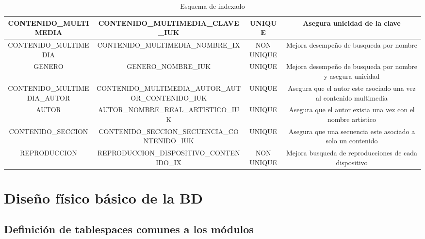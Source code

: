 \documentclass[journal]{IEEEtran}
\begin{document}
\begin{table}[H]
{\begin{tabular}{|c | c | c | c |}
   \hline
   CONTENIDO\_MULTIMEDIA & CONTENIDO\_MULTIMEDIA\_CLAVE\_IUK & UNIQUE & Asegura unicidad de la clave \\
   \hline
   CONTENIDO\_MULTIMEDIA & CONTENIDO\_MULTIMEDIA\_NOMBRE\_IX & NON UNIQUE & Mejora desempeño de busqueda por nombre \\
   \hline
   GENERO & GENERO\_NOMBRE\_IUK & UNIQUE & Mejora desempeño de busqueda por nombre y asegura unicidad \\
   \hline
   CONTENIDO\_MULTIMEDIA\_AUTOR & CONTENIDO\_MULTIMEDIA\_AUTOR\_AUTOR\_CONTENIDO\_IUK & UNIQUE & Asegura que el autor este asociado una vez al contenido multimedia \\
   \hline
   AUTOR & AUTOR\_NOMBRE\_REAL\_ARTISTICO\_IUK & UNIQUE & Asegura que el autor exista una vez con el nombre artistico \\
   \hline
   CONTENIDO\_SECCION & CONTENIDO\_SECCION\_SECUENCIA\_CONTENIDO\_IUK & UNIQUE & Asegura que una secuencia este asociado a solo un contenido \\
   \hline
   REPRODUCCION & REPRODUCCION\_DISPOSITIVO\_CONTENIDO\_IX & NON UNIQUE & Mejora busqueda de reproducciones de cada dispositivo \\ [1ex] 
   \hline
  \end{tabular}}
  \caption{Esquema de indexado}
  \label{tabla:5}
\end{table}
\section{Diseño físico básico de la BD}
\subsection{Definición de tablespaces comunes a los módulos}
\begin{table}[H]
  \centering
  \caption{Configuración de tablespaces comunes a los módulos}
  \label{tabla:6}
\end{table}
\end{document}
